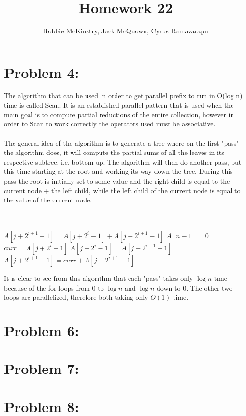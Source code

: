 \documentclass[12pt]{article}
\begin{document}
\title{Homework 22}
\author{Robbie McKinstry, Jack McQuown, Cyrus Ramavarapu}
\renewcommand{\today}{24 October 2016}
\renewcommand{\baselinestretch}{1.5}
\maketitle

\section*{Problem 4: }
The algorithm that can be used in order to get parallel prefix to run in {O(log n)} time is called Scan. It is an established parallel 
pattern that is used when the main goal is to compute partial reductions of the entire collection, however in order to Scan to work 
correctly the operators used must be associative.\\\\
The general idea of the algorithm is to generate a tree where on the first "pass" the algorithm does, it will compute the partial
sums of all the leaves in 
its respective subtree, i.e. bottom-up. The algorithm will then do another pass, but this time starting at the root and working its 
way down the tree. During this pass the root is initially set to some value and the right child is equal to the current node + the left 
child, while the left child of the current node is equal to the value of the current node.\\\\
\begin{algorithm}[H]
\\
 {
	{$A[j + 2^{i+1} - 1] = A[j + 2^i-1] + A[j + 2^{i+1} - 1]$}
}
{$A[n-1] = 0$}
 {
 {
	{$curr = A[j + 2^i -1]$} 
	{$A[j + 2^i - 1] = A[j + 2^{i+1} - 1]$} 
	{$A[j + 2^{i+1} - 1] = curr + A[j + 2^{i+1} -1]$} 
	}
}
\end{algorithm}
It is clear to see from this algorithm that each "pass" takes only {$\log n$} time because of the for loops from 0 to {$\log n$} and {$\log n$} down to 0. The other two loops are parallelized, therefore both taking only {$O(1)$} time.
\section*{Problem 6: }
\section*{Problem 7: }
\section*{Problem 8: }
\end{document}
